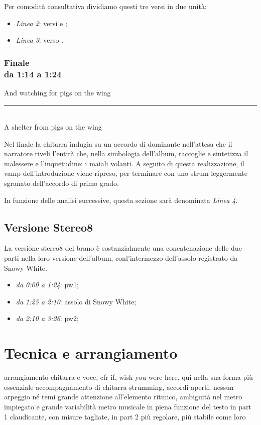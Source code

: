 \documentclass[class=book, crop=false, oneside, 12pt]{standalone}
\begin{document}
    Per comodità consultativa dividiamo questi tre versi in due unità: 
    \begin{itemize}
        \item \emph{Linea 2}: versi  e ;
        \item \emph{Linea 3}: verso .
    \end{itemize}
        
        
    \subsubsection*{Finale\\ \small{da 1:14 a 1:24}}
    \begin{displayquote}
        And watching for pigs on the wing \\
        \vspace{0pt}
        \rule{.4\linewidth}{.5pt} \\ %
        A shelter from pigs on the wing 
    \end{displayquote}
    Nel finale la chitarra indugia su un accordo di dominante nell'attesa che il narratore riveli l'entità che, nella simbologia dell'album, raccoglie e sintetizza il malessere e l'inquetudine: i maiali volanti. A seguito di questa realizzazione, il vamp dell'introduzione viene ripreso, per terminare con uno strum leggermente sgranato dell'accordo di primo grado.
    
    In funzione delle analisi successive, questa sezione sarà denominata \emph{Linea 4}.

    \subsection{Versione Stereo8}
    La versione stereo8 del brano è sostanzialmente una concatenazione delle due parti nella loro versione dell'album, conl'intermezzo dell'assolo registrato da Snowy White. 

    \begin{itemize}
        \item \emph{da 0:00 a 1:24}: \acrlong{pw1};
        \item \emph{da 1:25 a 2:10}: assolo di Snowy White;
        \item \emph{da 2:10 a 3:26}: \acrlong{pw2};
    \end{itemize}

    \section{Tecnica e arrangiamento}
    \label{sec:03-arrangement}
    arrangiamento chitarra e voce, cfr if, wish you were here, qui nella sua forma più essenziale
    accompagnamento di chitarra strumming, accordi aperti, nessun arpeggio né temi
    grande attenzione all'elemento ritmico, ambiguità nel metro impiegato e grande variabilità
    metro musicale in piena funzione del testo
    in part 1 claudicante, con misure tagliate, in part 2 più regolare, più stabile come loro
\end{document}
